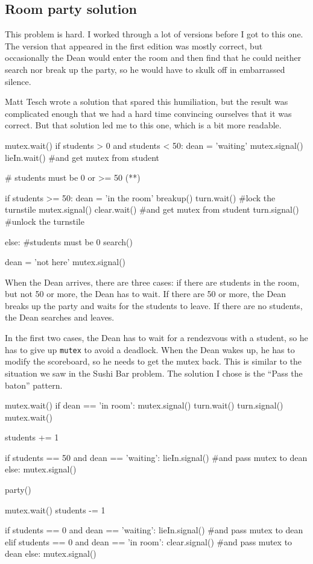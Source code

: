 \documentclass{book}
\begin{document}
\subsection {Room party solution}

This problem is hard.  I worked through a lot of versions before
I got to this one.  The version that appeared in the first edition
was mostly correct, but occasionally the Dean would enter the
room and then find that he could neither search nor break up the
party, so he would have to skulk off in embarrassed silence.

Matt Tesch wrote a solution that spared this humiliation, but the
result was complicated enough that we had a hard time convincing
ourselves that it was correct.  But that solution led me to this one,
which is a bit more readable.


\begin{unbreakable}[title={Room party solution (dean)}]{}
mutex.wait()
 if students > 0 and students < 50:
  dean = 'waiting'
  mutex.signal()
  lieIn.wait() #and get mutex from student

 # students must be 0 or >= 50     (*\label{roomparty1}*)

 if students >= 50:
  dean = 'in the room'
  breakup()
  turn.wait()  #lock the turnstile
  mutex.signal()
  clear.wait() #and get mutex from student
  turn.signal() #unlock the turnstile

 else:         #students must be 0
  search()

dean = 'not here'
mutex.signal() 
\end{unbreakable}

When the Dean arrives, there are three cases: if there are students in
the room, but not 50 or more, the Dean has to wait.  If there are 50
or more, the Dean breaks up the party and waits for the students to
leave.  If there are no students, the Dean searches and leaves.

In the first two cases, the Dean has to wait for a rendezvous with a
student, so he has to give up {\tt mutex} to avoid a deadlock.  When
the Dean wakes up, he has to modify the scoreboard, so he needs to get
the mutex back.  This is similar to the situation we saw in the Sushi
Bar problem.  The solution I chose is the ``Pass the baton'' pattern.


\begin{unbreakable}[title={Room party solution (student)}]{}
mutex.wait()
 if dean == 'in room':
  mutex.signal()
  turn.wait()
  turn.signal()
  mutex.wait()

 students += 1

 if students == 50 and dean == 'waiting':
  lieIn.signal() #and pass mutex to dean
 else:
  mutex.signal()

party()

mutex.wait()
 students -= 1

 if students == 0 and dean == 'waiting':
  lieIn.signal() #and pass mutex to dean
 elif students == 0 and dean == 'in room':
  clear.signal() #and pass mutex to dean
 else:
  mutex.signal()
\end{unbreakable}
\end{document}
